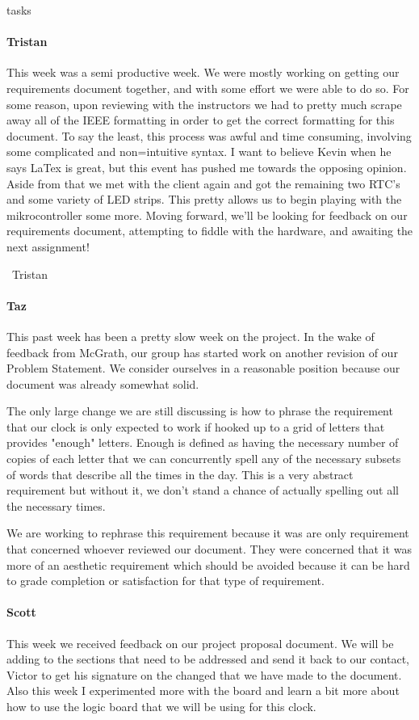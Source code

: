 tasks\documentclass[onecolumn, draftclsnofoot,10pt, compsoc]{IEEEtran}
\begin{document}
\paragraph{Tristan}
This week was a semi productive week. We were mostly working on getting our requirements document together, and with some effort we were able to do so. For some reason, upon reviewing with the instructors we had to pretty much scrape away all of the IEEE formatting in order to get the correct formatting for this document. To say the least, this process was awful and time consuming, involving some complicated and non=intuitive syntax. I want to believe Kevin when he says LaTex is great, but this event has pushed me towards the opposing opinion. Aside from that we met with the client again and got the remaining two RTC's and some variety of LED strips. This pretty allows us to begin playing with the mikrocontroller some more. Moving forward, we'll be looking for feedback on our requirements document, attempting to fiddle with the hardware, and awaiting the next assignment!

~Tristan
\paragraph{Taz}
This past week has been a pretty slow week on the project. In the wake of feedback from McGrath, our group has started work on another revision of our Problem Statement. We consider ourselves in a reasonable position because our document was already somewhat solid.

The only large change we are still discussing is how to phrase the requirement that our clock is only expected to work if hooked up to a grid of letters that provides "enough" letters. Enough is defined as having the necessary number of copies of each letter that we can concurrently spell any of the necessary subsets of words that describe all the times in the day. This is a very abstract requirement but without it, we don't stand a chance of actually spelling out all the necessary times.

We are working to rephrase this requirement because it was are only requirement that concerned whoever reviewed our document. They were concerned that it was more of an aesthetic requirement which should be avoided because it can be hard to grade completion or satisfaction for that type of requirement.
\paragraph{Scott}
This week we received feedback on our project proposal document. We will be adding to the sections that need to be addressed and send it back to our contact, Victor to get his signature on the changed that we have made to the document. Also this week I experimented more with the board and learn a bit more about how to use the logic board that we will be using for this clock.
\end{document}
